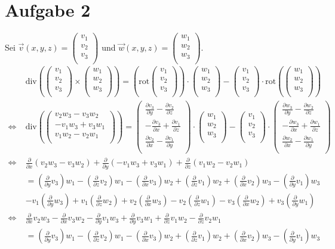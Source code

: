 \documentclass[10pt,a4paper,parskip=half]{scrartcl}
\newcommand{\vecthree}[3]{\begin{pmatrix}#1\\#2\\#3\\\end {pmatrix}}
\begin{document}
\section*{Aufgabe 2}
Sei $\vec v(x,y,z) = \vecthree{v_1}{v_2}{v_3}$ und $\vec w(x,y,z) = \vecthree{w_1}{w_2}{w_3}$. 
\begin{align*}
&\text{div}\left(\vecthree{v_1}{v_2}{v_3} \times \vecthree{w_1}{w_2}{w_3}\right) = \left( \text{rot} \vecthree{v_1}{v_2}{v_3} \right) \cdot \vecthree{w_1}{w_2}{w_3} - \vecthree{v_1}{v_2}{v_3} \cdot \text{rot}\left( \vecthree{w_1}{w_2}{w_3} \right) \\
\Leftrightarrow\; &\text{div}\left(\vecthree{v_2w_3 - v_3w_2}{-v_1w_3 + v_3w_1}{v_1w_2 - v_2w_1}\right) = \vecthree{\frac{\partial v_3}{\partial y} - \frac{\partial v_2}{\partial z}}{- \frac{\partial v_3}{\partial x} + \frac{\partial v_1}{\partial z}}{\frac{\partial v_2}{\partial x} - \frac{\partial v_1}{\partial y}} \cdot \vecthree{w_1}{w_2}{w_3} - \vecthree{v_1}{v_2}{v_3} \cdot \vecthree{\frac{\partial w_3}{\partial y} - \frac{\partial w_2}{\partial z}}{- \frac{\partial w_3}{\partial x} + \frac{\partial w_1}{\partial z}}{\frac{\partial w_2}{\partial x} - \frac{\partial w_1}{\partial y}} \\
\Leftrightarrow\; &\frac{\partial }{\partial x}(v_2w_3 - v_3w_2) + \frac{\partial }{\partial y}(-v_1w_3 + v_3w_1) + \frac{\partial }{\partial z}(v_1w_2 - v_2w_1)\\
&= \left(\frac{\partial }{\partial y}v_3\right)w_1 - \left(\frac{\partial }{\partial z}v_2\right)w_1 - \left(\frac{\partial }{\partial x}v_3\right)w_2 + \left(\frac{\partial }{\partial z}v_1\right)w_2 + \left(\frac{\partial }{\partial x}v_2\right)w_3 - \left(\frac{\partial }{\partial y}v_1\right)w_3\\
 &- v_1\left(\frac{\partial }{\partial y}w_3\right) + v_1\left(\frac{\partial }{\partial z}w_2\right) + v_2\left(\frac{\partial }{\partial x}w_3\right) - v_2\left(\frac{\partial }{\partial z}w_1\right) - v_3\left(\frac{\partial }{\partial x}w_2\right) + v_3\left(\frac{\partial }{\partial y}w_1\right) \\
\Leftrightarrow\; &\frac{\partial }{\partial x}v_2w_3 - \frac{\partial }{\partial x}v_3w_2 - \frac{\partial }{\partial y}v_1w_3 + \frac{\partial }{\partial y}v_3w_1 + \frac{\partial }{\partial z}v_1w_2 - \frac{\partial }{\partial z}v_2w_1\\
&= \left(\frac{\partial }{\partial y}v_3\right)w_1 - \left(\frac{\partial }{\partial z}v_2\right)w_1 - \left(\frac{\partial }{\partial x}v_3\right)w_2 + \left(\frac{\partial }{\partial z}v_1\right)w_2 + \left(\frac{\partial }{\partial x}v_2\right)w_3 - \left(\frac{\partial }{\partial y}v_1\right)w_3\\

\end{align*}
\end{document}
